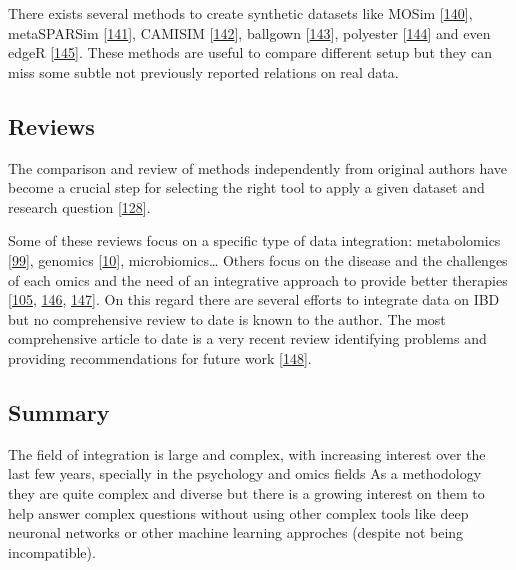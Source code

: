 \documentclass[
  a4paper,
]{book}
\begin{document}
There exists several methods to create synthetic datasets like MOSim {[}\protect\hyperlink{ref-haberman2019}{140}{]}, metaSPARSim {[}\protect\hyperlink{ref-patuzzi2019}{141}{]}, CAMISIM {[}\protect\hyperlink{ref-fritz2019}{142}{]}, ballgown {[}\protect\hyperlink{ref-fu2021}{143}{]}, polyester {[}\protect\hyperlink{ref-frazee2021}{144}{]} and even edgeR {[}\protect\hyperlink{ref-mccarthy2012}{145}{]}.
These methods are useful to compare different setup but they can miss some subtle not previously reported relations on real data.

\hypertarget{reviews}{%
\subsection{Reviews}\label{reviews}}

The comparison and review of methods independently from original authors have become a crucial step for selecting the right tool to apply a given dataset and research question {[}\protect\hyperlink{ref-cantini_benchmarking_2020}{128}{]}.

Some of these reviews focus on a specific type of data integration: metabolomics {[}\protect\hyperlink{ref-cavill2016}{99}{]}, genomics {[}\protect\hyperlink{ref-mcgovern2015}{10}{]}, microbiomics\ldots{} Others focus on the disease and the challenges of each omics and the need of an integrative approach to provide better therapies {[}\protect\hyperlink{ref-tarazona2021}{105}, \protect\hyperlink{ref-de_souza_ibd_2017}{146}, \protect\hyperlink{ref-valles-colomer2016}{147}{]}.
On this regard there are several efforts to integrate data on IBD but no comprehensive review to date is known to the author.
The most comprehensive article to date is a very recent review identifying problems and providing recommendations for future work {[}\protect\hyperlink{ref-sudhakar2022}{148}{]}.

\hypertarget{methods-integration}{%
\subsection{Summary}\label{methods-integration}}

The field of integration is large and complex, with increasing interest over the last few years, specially in the psychology and omics fields As a methodology they are quite complex and diverse but there is a growing interest on them to help answer complex questions without using other complex tools like deep neuronal networks or other machine learning approches (despite not being incompatible).
\end{document}
